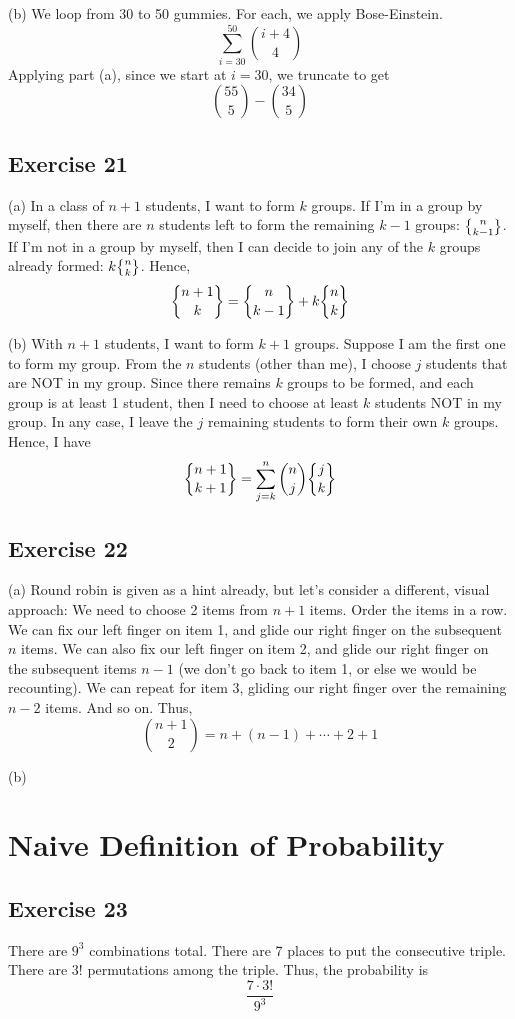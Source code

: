 \documentclass{book}
\newcommand{\bracenom}{\genfrac{\lbrace}{\rbrace}{0pt}{}}
\begin{document}
\noindent
(b) We loop from 30 to 50 gummies. For each, we apply Bose-Einstein.
$$\sum_{i = 30}^{50} \binom{i + 4}{4}$$
Applying part (a), since we start at $i = 30$, we truncate to get
$$\binom{55}{5} - \binom{34}{5}$$

\subsection*{Exercise 21}
(a) In a class of $n + 1$ students, I want to form $k$ groups. If I'm in a group by myself, then there are $n$ students left to form the remaining $k - 1$ groups: $\bracenom{n}{k - 1}$. If I'm not in a group by myself, then I can decide to join any of the $k$ groups already formed: $k \bracenom{n}{k}$. Hence,
$$\bracenom{n + 1}{k} = \bracenom{n}{k - 1} + k\bracenom{n}{k}$$

\noindent
(b) With $n + 1$ students, I want to form $k + 1$ groups. Suppose I am the first one to form my group. From the $n$ students (other than me), I choose $j$ students that are NOT in my group. Since there remains $k$ groups to be formed, and each group is at least 1 student, then I need to choose at least $k$ students NOT in my group. In any case, I leave the $j$ remaining students to form their own $k$ groups. Hence, I have
$$\bracenom{n + 1}{k + 1} = \sum_{j = k}^n \binom{n}{j} \bracenom{j}{k}$$

\subsection*{Exercise 22}
(a) Round robin is given as a hint already, but let's consider a different, visual approach: We need to choose 2 items from $n + 1$ items. Order the items in a row. We can fix our left finger on item 1, and glide our right finger on the subsequent $n$ items. We can also fix our left finger on item 2, and glide our right finger on the subsequent items $n - 1$ (we don't go back to item 1, or else we would be recounting). We can repeat for item 3, gliding our right finger over the remaining $n - 2$ items. And so on. Thus,
$$\binom{n + 1}{2} = n + (n - 1) + \cdots + 2 + 1$$

\noindent
(b)

\section{Naive Definition of Probability}

\subsection*{Exercise 23}
There are $9^3$ combinations total. There are 7 places to put the consecutive triple. There are $3!$ permutations among the triple. Thus, the probability is
$$\frac{7 \cdot 3!}{9^3}$$
\end{document}
